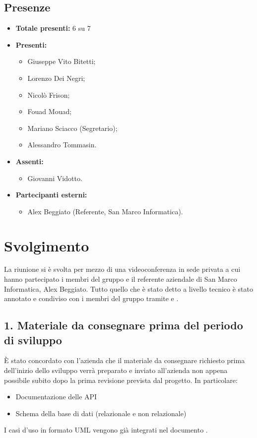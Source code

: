 \subsection*{Presenze}
	\begin{itemize}
		\item \textbf{Totale presenti:} 6 su 7
		\item \textbf{Presenti: }
			\begin{itemize}			
				\item Giuseppe Vito Bitetti;
				\item Lorenzo Dei Negri;
				\item Nicolò Frison;
				\item Fouad Mouad;
				\item Mariano Sciacco (Segretario);
				\item Alessandro Tommasin.
			\end{itemize}
		\item \textbf{Assenti: } 
			\begin{itemize}	
				\item Giovanni Vidotto.
			\end{itemize}
		\item \textbf{Partecipanti esterni:}
			\begin{itemize}
				\item Alex Beggiato (Referente, San Marco Informatica).
			\end{itemize}
	\end{itemize}


\newpage
\section*{Svolgimento}

	La riunione si è svolta per mezzo di una videoconferenza in sede privata a cui hanno partecipato i membri del gruppo e il referente aziendale di San Marco Informatica, Alex Beggiato. Tutto quello che è stato detto a livello tecnico è stato annotato e condiviso con i membri del gruppo tramite  e .

	\subsection*{1. Materiale da consegnare prima del periodo di sviluppo}

	È stato concordato con l'azienda che il materiale da consegnare richiesto prima dell'inizio dello sviluppo verrà preparato e inviato all'azienda non appena possibile subito dopo la prima revisione prevista dal progetto. In particolare:
	\begin{itemize}
		\item Documentazione delle API
		\item Schema della base di dati (relazionale e non relazionale)
	\end{itemize}
	I casi d'uso in formato UML vengono già integrati nel documento .

